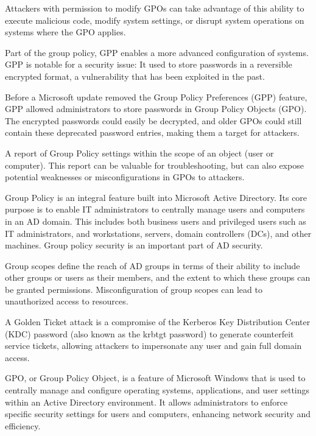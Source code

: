  Attackers with permission to modify GPOs can take advantage of this ability to execute malicious code, modify system settings, or disrupt system operations on systems where the GPO applies.

 Part of the group policy, GPP enables a more advanced configuration of systems. GPP is notable for a security issue: It used to store passwords in a reversible encrypted format, a vulnerability that has been exploited in the past.

 Before a Microsoft update removed the Group Policy Preferences (GPP) feature, GPP allowed administrators to store passwords in Group Policy Objects (GPO). The encrypted passwords could easily be decrypted, and older GPOs could still contain these deprecated password entries, making them a target for attackers.

 A report of Group Policy settings within the scope of an object (user or computer). This report can be valuable for troubleshooting, but can also expose potential weaknesses or misconfigurations in GPOs to attackers.

 Group Policy is an integral feature built into Microsoft Active Directory. Its core purpose is to enable IT administrators to centrally manage users and computers in an AD domain. This includes both business users and privileged users such as IT administrators, and workstations, servers, domain controllers (DCs), and other machines. Group policy security is an important part of AD security.

 Group scopes define the reach of AD groups in terms of their ability to include other groups or users as their members, and the extent to which these groups can be granted permissions. Misconfiguration of group scopes can lead to unauthorized access to resources.

 A Golden Ticket attack is a compromise of the Kerberos Key Distribution Center (KDC) password (also known as the krbtgt password) to generate counterfeit service tickets, allowing attackers to impersonate any user and gain full domain access.

 GPO, or Group Policy Object, is a feature of Microsoft Windows that is used to centrally manage and configure operating systems, applications, and user settings within an Active Directory environment. It allows administrators to enforce specific security settings for users and computers, enhancing network security and efficiency.

